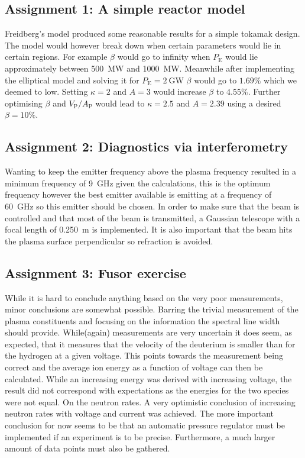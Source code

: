 
\subsection{Assignment 1: A simple reactor model}

Freidberg's model produced some reasonable results for a simple tokamak design. The model would however break down when certain parameters would lie in certain regions. For example $\beta$ would go to infinity when $P_{\mathrm{E}}$ would lie approximately between \SI{500}{\mega\watt} and \SI{1000}{\mega\watt}. Meanwhile after implementing the elliptical model and solving it for $P_{\mathrm{E}}=\SI{2}{\giga\watt}$ $\beta$ would go to $1.69\%$ which we deemed to low. Setting $\kappa=2$ and $A=3$ would increase $\beta$ to $4.55\%$. Further optimising $\beta$ and $V_{\mathrm{P}}/A_{\mathrm{P}}$ would lead to $\kappa=2.5$ and $A=2.39$ using a desired $\beta=10\%$.

\subsection{Assignment 2: Diagnostics via interferometry}

Wanting to keep the emitter frequency above the plasma frequency resulted in a minimum frequency of \SI{9}{\giga\hertz} given the calculations, this is the optimum frequency however the best emitter available is emitting at a frequency of \SI{60}{\giga\hertz} so this emitter should be chosen. In order to make sure that the beam is controlled and that most of the beam is transmitted, a Gaussian telescope with a focal length of \SI{0.250}{\meter} is implemented. It is also important that the beam hits the plasma surface perpendicular so refraction is avoided.

\subsection{Assignment 3: Fusor exercise}
While it is hard to conclude anything based on the very poor measurements, minor conclusions are somewhat possible. Barring the trivial measurement of the plasma constituents and focusing on the information the spectral line width should provide. While(again) measurements are very uncertain it does seem, as expected, that it measures that the velocity of the deuterium is smaller than for the hydrogen at a given voltage. This points towards the measurement being correct and the average ion energy as a function of voltage can then be calculated. While an increasing energy was derived with increasing voltage, the result did not correspond with expectations as the energies for the two species were not equal. On the neutron rates. A very optimistic conclusion of increasing neutron rates with voltage and current was achieved. The more important conclusion for now seems to be that an automatic pressure regulator must be implemented if an experiment is to be precise. Furthermore, a much larger amount of data points must also be gathered.